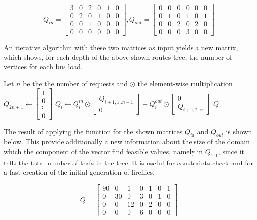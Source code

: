 \documentclass[tuberlin,cic,tc,openright,english,noabntcite,oneside]{iiufrgs}
\begin{document}
$$
Q_{in} = 
\begin{bmatrix}
3 & 0 & 2 & 0 & 1 & 0\\
0 & 2 & 0 & 1 & 0 & 0\\
0 & 0 & 1 & 0 & 0 & 0\\
0 & 0 & 0 & 0 & 0 & 0
\end{bmatrix}
,
Q_{out} = 
\begin{bmatrix}
0 & 0 & 0 & 0 & 0 & 0\\
0 & 1 & 0 & 1 & 0 & 1\\
0 & 0 & 2 & 0 & 2 & 0\\
0 & 0 & 0 & 3 & 0 & 0
\end{bmatrix}
$$

An iterative algorithm with these two matrices as input yields a new matrix, which shows, for each depth of the above shown routes tree, the number of vertices for each bus load.

\begin{algorithmic}
\State Let $n$ be the the number of requests and $\odot$ the element-wise multiplication
\State $\displaystyle Q_{2n+1} \gets \begin{bmatrix}1\\ 0 \\ \vdots \\0 \end{bmatrix}$
	\State $\displaystyle Q_{i} \gets Q^{in}_{i} \odot \begin{bmatrix}Q_{i+1,1..n-1} \\ 0\end{bmatrix}
	+ Q^{out}_{i} \odot \begin{bmatrix}0\\ Q_{i+1,2..n}\end{bmatrix}$
\EndFor
\State \Return $Q$
\EndFunction
\end{algorithmic}

The result of applying the function for the shown matrices $Q_{in}$ and $Q_{out}$ is shown below. This provide additionally a new information about the size of the domain which the component of the vector find feasible values, namely in $Q_{1,1}$, since it tells the total number of leafs in the tree. It is useful for constraints check and for a fast creation of the initial generation of fireflies.

$$
Q = 
\begin{bmatrix}
90 & 0 & 6 & 0 & 1 & 0 & 1\\
0 & 30 & 0 & 3 & 0 & 1 & 0\\
0 & 0 & 12 & 0 & 2 & 0 & 0\\
0 & 0 & 0 & 6 & 0 & 0 & 0
\end{bmatrix}
$$
\end{document}
